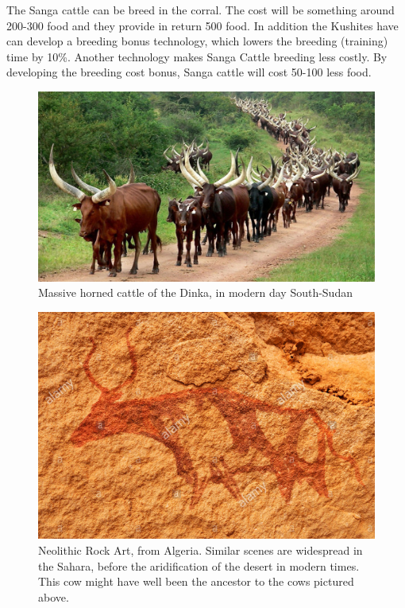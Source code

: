 \documentclass[a4paper,12pt]{scrreprt}
\begin{document}
The Sanga cattle can be breed in the corral. The cost will be something around 200-300 food and they provide in return 500 food. In addition the Kushites have can develop a breeding bonus technology, which lowers the breeding (training) time by 10\%. Another technology makes Sanga Cattle breeding less costly. By developing the breeding cost bonus, Sanga cattle will cost 50-100 less food.\\

\begin{figure}[H]
	\centering
	\includegraphics[width=\textwidth]{img/corral/herd_of_sanga_cattles}
	\caption{Massive horned cattle of the Dinka, in modern day South-Sudan}
\end{figure}

\begin{figure}[H]
	\centering
	\includegraphics[width=\textwidth]{img/corral/neolethic_rock_art_sanga_cattle}
	\caption{Neolithic Rock Art, from Algeria. Similar scenes are widespread in the Sahara, before the aridification of the desert in modern times. This cow might have well been the ancestor to the cows pictured above.}
\end{figure}
\end{document}
